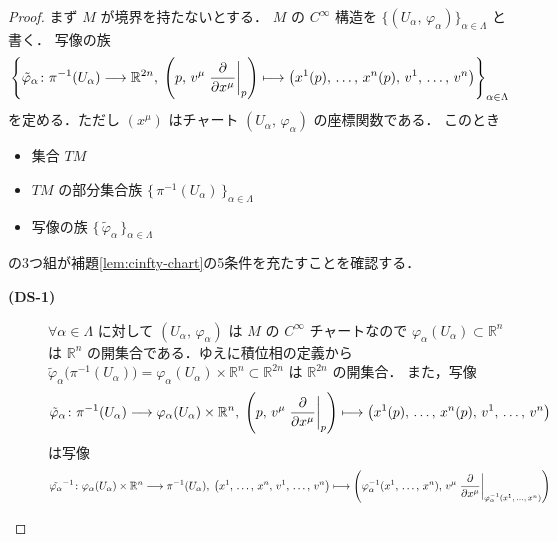 \documentclass[geometry_main]{subfiles}
\begin{document}
\begin{proof}
    まず $M$ が境界を持たないとする．
    $M$ の $C^\infty$ 構造を $\{(U_\alpha,\, \varphi_\alpha)\}_{\alpha \in \Lambda}$ と書く．
    写像の族
    \begin{align}
        \left\{\tilde{\varphi}_\alpha \colon \pi^{-1} (U_\alpha) \lto \mathbb{R}^{2n},\; \left(p,\, v^\mu \eval{\pdv{}{x^\mu}}_p \right) \lmto \bigl( x^1 (p),\, \dots,\, x^n(p),\, v^1,\, \dots,\, v^n \bigr) \right\}_{\alpha \in \Lambda}
    \end{align}
    を定める．ただし $(x^\mu)$ はチャート $(U_\alpha,\, \varphi_\alpha)$ の座標関数である．
    このとき
    \begin{itemize}
        \item 集合 $TM$
        \item $TM$ の部分集合族 $\bigl\{\, \pi^{-1}(U_\alpha) \,\bigr\}_{\alpha \in \Lambda}$
        \item 写像の族 $\bigl\{\, \tilde{\varphi}_\alpha \,\bigr\}_{\alpha \in \Lambda}$
    \end{itemize}
    の3つ組が補題\ref{lem:cinfty-chart}の5条件を充たすことを確認する．
    \begin{description}
        \item[\textbf{(DS-1)}] $\forall \alpha \in \Lambda$ に対して $(U_\alpha,\, \varphi_\alpha)$ は $M$ の $C^\infty$ チャートなので $\varphi_\alpha(U_\alpha) \subset \mathbb{R}^n$ は $\mathbb{R}^n$ の開集合である．ゆえに積位相の定義から $\tilde{\varphi}_\alpha \bigl( \pi^{-1} (U_\alpha) \bigr) = \varphi_\alpha (U_\alpha) \times \mathbb{R}^n \subset \mathbb{R}^{2n}$ は $\mathbb{R}^{2n}$ の開集合．
        また，写像
        \begin{align}
            \tilde{\varphi}_\alpha \colon \pi^{-1} (U_\alpha) \lto \varphi_\alpha (U_\alpha) \times \mathbb{R}^n,\; \left(p,\, v^\mu \eval{\pdv{}{x^\mu}}_p \right) \lmto \bigl( x^1 (p),\, \dots,\, x^n(p),\, v^1,\, \dots,\, v^n \bigr) 
        \end{align}
        は写像
        \begin{align}
            \tilde{\varphi_\alpha}^{-1} \colon \varphi_\alpha(U_\alpha) \times \mathbb{R}^n \lto \pi^{-1} (U_\alpha),\; \bigl( x^1,\, \dots,\, x^n,\, v^1,\, \dots,\, v^n \bigr) \lmto \left(\varphi_\alpha^{-1}(x^1,\, \dots,\, x^n),\, v^\mu \eval{\pdv{}{x^\mu}}_{\varphi_\alpha^{-1}(x^1,\, \dots,\, x^n)} \right)
        \end{align}

\end{description}
\end{proof}
\end{document}
